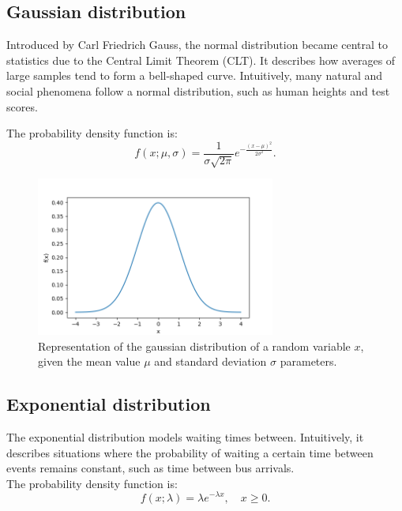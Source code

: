 \documentclass{book}
\begin{document}
\newpage

\subsection{Gaussian distribution}
Introduced by Carl Friedrich Gauss, the normal distribution became central to statistics due to the Central Limit Theorem (CLT). It describes how averages of large samples tend to form a bell-shaped curve. Intuitively, many natural and social phenomena follow a normal distribution, such as human heights and test scores.

The probability density function is:
\begin{equation}
    f(x; \mu, \sigma) = \frac{1}{\sigma \sqrt{2\pi}} e^{-\frac{(x-\mu)^2}{2\sigma^2}}.
\end{equation}

\begin{figure}[ht]
    \centering
    \includegraphics[width=0.7\textwidth]{figures/chapter2/normal.png}
    \caption{Representation of the gaussian distribution of a random variable $x$, given the mean value $\mu$ and standard deviation $\sigma$ parameters.}
    \label{fig:gaussian1}
\end{figure}

\newpage

\subsection{Exponential distribution}
The exponential distribution models waiting times between. Intuitively, it describes situations where the probability of waiting a certain time between events remains constant, such as time between bus arrivals.\\

The probability density function is:
\begin{equation}
    f(x; \lambda) = \lambda e^{-\lambda x}, \quad x \geq 0.
\end{equation}
\end{document}
